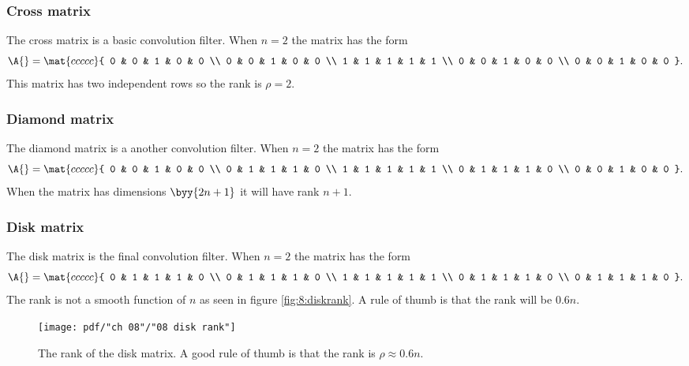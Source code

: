 \subsubsection{Cross matrix}
The cross matrix is a basic convolution filter. When $n=2$ the matrix has the form
\begin{equation}
  \A{} = 
  \mat{ccccc}{
 0 & 0 & 1 & 0 & 0 \\
 0 & 0 & 1 & 0 & 0 \\
 1 & 1 & 1 & 1 & 1 \\
 0 & 0 & 1 & 0 & 0 \\
 0 & 0 & 1 & 0 & 0
}.
\end{equation}
This matrix has two independent rows so the rank is $\rho = 2$.
\subsubsection{Diamond matrix}
The diamond matrix is a another convolution filter. When $n=2$ the matrix has the form
\begin{equation}
  \A{} = 
  \mat{ccccc}{
 0 & 0 & 1 & 0 & 0 \\
 0 & 1 & 1 & 1 & 0 \\
 1 & 1 & 1 & 1 & 1 \\
 0 & 1 & 1 & 1 & 0 \\
 0 & 0 & 1 & 0 & 0
}.
\end{equation}
When the matrix has dimensions $\byy{2n+1}$ it will have rank $n+1$.

\subsubsection{Disk matrix}
The disk matrix is the final convolution filter. When $n=2$ the matrix has the form
\begin{equation}
  \A{} = 
  \mat{ccccc}{
 0 & 1 & 1 & 1 & 0 \\
 0 & 1 & 1 & 1 & 0 \\
 1 & 1 & 1 & 1 & 1 \\
 0 & 1 & 1 & 1 & 0 \\
 0 & 1 & 1 & 1 & 0
}.
\end{equation}
The rank is not a smooth function of $n$ as seen in figure \eqref{fig:8:diskrank}. A rule of thumb is that the rank will be $0.6n$.
\begin{figure}[htbp] %
   \centering
   \texttt{[image: pdf/"ch 08"/"08 disk rank"]} 
   \caption[The rank of the disk matrix]{The rank of the disk matrix. A good rule of thumb is that the rank is  $\rho \approx 0.6n$.}
   \label{fig:8:diskrank}
\end{figure}%

